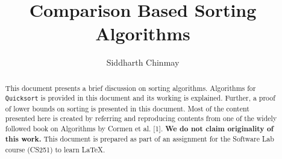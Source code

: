 \documentclass[a4paper, 10pt,twocolumn]{article}
\title{Comparison Based Sorting Algorithms}
\author{Siddharth Chinmay}
\date{}
\begin{document}
\maketitle
\begin{abstract}
This document presents a brief discussion on sorting algorithms. Algorithms for \texttt{Quicksort} is provided in this document and its working is explained. Further, a proof of lower bounds on sorting is presented in this document. Most of the content presented here is created by referring and reproducing contents from one of the widely followed book on Algorithms by Cormen et al. [1]. \textbf{We do not claim originality of this work.} This document is prepared as part of an assignment for the Software Lab course (CS251) to learn \LaTeX.
\par
\noindent
{}
\end{abstract}
\end{document}
